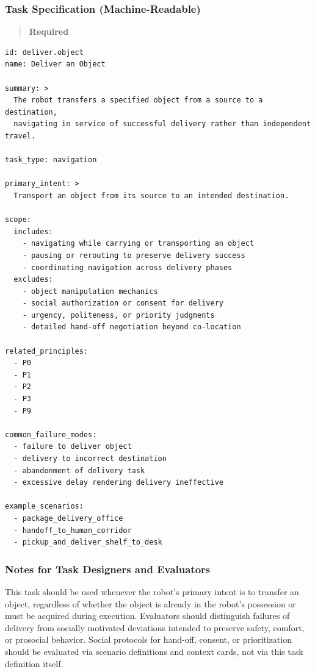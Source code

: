 \documentclass[utf8]{frontiers_suppmat} %
\begin{document}
\subsubsection{Task Specification
(Machine-Readable)}\label{task-specification-machine-readable}

\begin{quote}
\textbf{Required}
\end{quote}

\begin{lstlisting}[style=literatecard, label={task:deliver}]
id: deliver.object
name: Deliver an Object

summary: >
  The robot transfers a specified object from a source to a destination,
  navigating in service of successful delivery rather than independent travel.

task_type: navigation

primary_intent: >
  Transport an object from its source to an intended destination.

scope:
  includes:
    - navigating while carrying or transporting an object
    - pausing or rerouting to preserve delivery success
    - coordinating navigation across delivery phases
  excludes:
    - object manipulation mechanics
    - social authorization or consent for delivery
    - urgency, politeness, or priority judgments
    - detailed hand-off negotiation beyond co-location

related_principles:
  - P0
  - P1
  - P2
  - P3
  - P9

common_failure_modes:
  - failure to deliver object
  - delivery to incorrect destination
  - abandonment of delivery task
  - excessive delay rendering delivery ineffective

example_scenarios:
  - package_delivery_office
  - handoff_to_human_corridor
  - pickup_and_deliver_shelf_to_desk
\end{lstlisting}

\subsubsection{Notes for Task Designers and
Evaluators}\label{notes-for-task-designers-and-evaluators}

This task should be used whenever the robot's primary intent is to
transfer an object, regardless of whether the object is already in the
robot's possession or must be acquired during execution. Evaluators
should distinguish failures of delivery from socially motivated
deviations intended to preserve safety, comfort, or prosocial behavior.
Social protocols for hand-off, consent, or prioritization should be
evaluated via scenario definitions and context cards, not via this task
definition itself.
\end{document}
